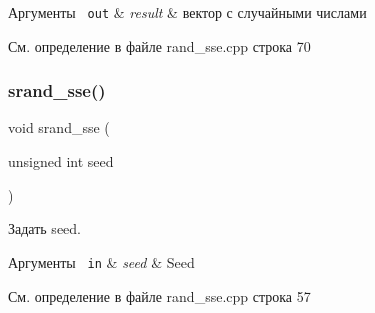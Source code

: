 \begin{DoxyParams}[1]{Аргументы}
\mbox{\texttt{ out}}  & {\em result} & вектор с случайными числами \\
\hline
\end{DoxyParams}


См. определение в файле rand\+\_\+sse.\+cpp строка 70

\mbox{\label{group__rand__ssecpp_ga80db1a2aa7de7edf52b9c60e101d556f}} 
\subsubsection{\texorpdfstring{srand\_sse()}{srand\_sse()}}
{\footnotesize\ttfamily void srand\+\_\+sse (\begin{DoxyParamCaption}\item[{unsigned int}]{seed }\end{DoxyParamCaption})}



Задать seed. 


\begin{DoxyCode}{0}
\end{DoxyCode}
 
\begin{DoxyParams}[1]{Аргументы}
\mbox{\texttt{ in}}  & {\em seed} & Seed \\
\hline
\end{DoxyParams}


См. определение в файле rand\+\_\+sse.\+cpp строка 57

